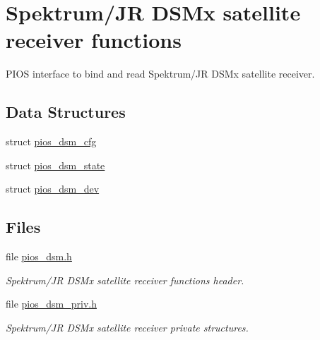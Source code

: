 \hypertarget{group___p_i_o_s___d_s_m}{\section{\-Spektrum/\-J\-R \-D\-S\-Mx satellite receiver functions}
\label{group___p_i_o_s___d_s_m}
}


\-P\-I\-O\-S interface to bind and read \-Spektrum/\-J\-R \-D\-S\-Mx satellite receiver.  


\subsection*{\-Data \-Structures}
\begin{DoxyCompactItemize}
\item 
struct \hyperlink{structpios__dsm__cfg}{pios\-\_\-dsm\-\_\-cfg}
\item 
struct \hyperlink{structpios__dsm__state}{pios\-\_\-dsm\-\_\-state}
\item 
struct \hyperlink{structpios__dsm__dev}{pios\-\_\-dsm\-\_\-dev}
\end{DoxyCompactItemize}
\subsection*{\-Files}
\begin{DoxyCompactItemize}
\item 
file \hyperlink{pios__dsm_8h}{pios\-\_\-dsm.\-h}
\begin{DoxyCompactList}\small\item\em \-Spektrum/\-J\-R \-D\-S\-Mx satellite receiver functions header. \end{DoxyCompactList}\item 
file \hyperlink{pios__dsm__priv_8h}{pios\-\_\-dsm\-\_\-priv.\-h}
\begin{DoxyCompactList}\small\item\em \-Spektrum/\-J\-R \-D\-S\-Mx satellite receiver private structures. \end{DoxyCompactList}\end{DoxyCompactItemize}
